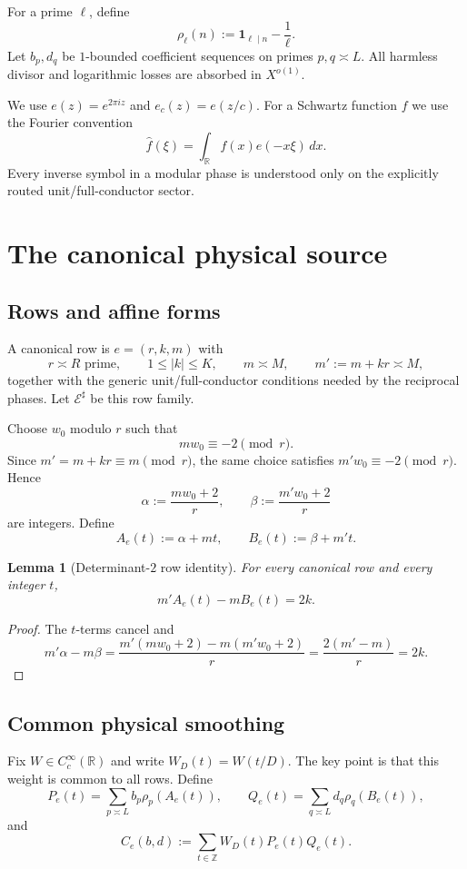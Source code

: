 \documentclass[11pt]{article}
\newtheorem{lemma}[lemma]{Lemma}
\theoremstyle{definition}
\newcommand{\1}{\mathbf 1}
\newcommand{\E}{\mathcal E}
\newcommand{\R}{\mathbb R}
\newcommand{\Z}{\mathbb Z}
\begin{document}
For a prime $\ell$, define
\begin{equation}
   \rho_\ell(n):=\1_{\ell\mid n}-\frac1\ell.
   \label{eq:rho-def}
\end{equation}
Let $b_p,d_q$ be $1$-bounded coefficient sequences on primes $p,q\asymp L$.
All harmless divisor and logarithmic losses are absorbed in $X^{o(1)}$.

We use $e(z)=e^{2\pi iz}$ and $e_c(z)=e(z/c)$.  For a Schwartz function
$f$ we use the Fourier convention
\[
   \widehat f(\xi)=\int_{\mathbb R} f(x)e(-x\xi)\,dx.
\]
Every inverse symbol in a modular phase is understood only on the explicitly
routed unit/full-conductor sector.

\section{The canonical physical source}
\subsection{Rows and affine forms}
A canonical row is $e=(r,k,m)$ with
\[
   r\asymp R \text{ prime},\qquad 1\le |k|\le K,\qquad
   m\asymp M,\qquad m':=m+kr\asymp M,
\]
together with the generic unit/full-conductor conditions needed by the
reciprocal phases. Let $\E^\sharp$ be this row family.

Choose $w_0$ modulo $r$ such that
\[
   mw_0\equiv -2\pmod r.
\]
Since $m'=m+kr\equiv m\pmod r$, the same choice satisfies
$m'w_0\equiv-2\pmod r$.  Hence
\[
   \alpha:=\frac{mw_0+2}{r},\qquad
   \beta:=\frac{m'w_0+2}{r}
\]
are integers.  Define
\[
   A_e(t):=\alpha+mt,\qquad
   B_e(t):=\beta+m't.
\]

\begin{lemma}[Determinant-$2$ row identity]
For every canonical row and every integer $t$,
\[
   m'A_e(t)-mB_e(t)=2k.
\]
\end{lemma}
\begin{proof}
The $t$-terms cancel and
\[
  m'\alpha-m\beta
  =\frac{m'(mw_0+2)-m(m'w_0+2)}{r}
  =\frac{2(m'-m)}r=2k.
\]
\end{proof}

\subsection{Common physical smoothing}
Fix $W\in C_c^\infty(\R)$ and write $W_D(t)=W(t/D)$. The key point is that
this weight is common to all rows. Define
\[
   P_e(t)=\sum_{p\asymp L}b_p\rho_p(A_e(t)),\qquad
   Q_e(t)=\sum_{q\asymp L}d_q\rho_q(B_e(t)),
\]
and
\begin{equation}
   C_e(b,d):=\sum_{t\in\Z}W_D(t)P_e(t)Q_e(t).
   \label{eq:Ce}
\end{equation}
\end{document}
